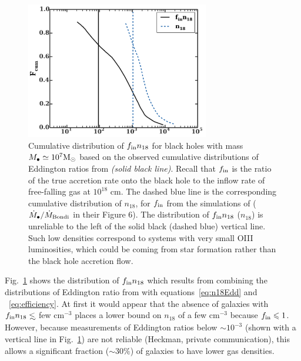 \documentclass[usenatbib,fleqn]{mnras}
\newcommand\lsim{\mathrel{\rlap{\lower4pt\hbox{\hskip1pt$\sim$}}
    \raise1pt\hbox{$<$}}}
\newcommand{\Mbh}[1][]{M_{\bullet#1}}
\newcommand{\Msun}{{\rm M_\odot}}
\begin{document}
\begin{figure}
\includegraphics[width=8cm]{fcum_n18.pdf}
\caption{\label{fig:n18Cum} Cumulative distribution of $f_{\rm in}
  n_{18}$ for black holes with mass $\Mbh\simeq 10^{7} \Msun$ based on
  the observed cumulative distributions of Eddington ratios from
  \citet{Kauffmann&Heckman2009} {\it (solid black line)}. Recall that
  $f_{\rm in}$ is the ratio of the true accretion rate onto the black
  hole to the inflow rate of free-falling gas at $10^{18}$ cm.  The
  dashed blue line is the corresponding cumulative distribution of
  $n_{18}$, for $f_{\rm in}$ from the simulations of \citet{Li+2013}
  ($\dot{M}_{\bullet}/\dot{M}_{\rm Bondi}$ in their Figure 6). The
  distribution of $f_{\rm in} n_{18}$ ($n_{18}$) is unreliable to the
  left of the solid black (dashed blue) vertical line. Such low
  densities correspond to systems with very small OIII luminosities,
  which could be coming from star formation rather than the black hole
  accretion flow.}
\end{figure}


Fig.~\ref{fig:n18Cum} shows the distribution of $f_{\rm in} n_{18}$ which results from combining the distributions of Eddington ratio from \citet{Kauffmann&Heckman2009} with equations~\eqref{eq:n18Edd} and
~\eqref{eq:efficiency}.  At first it would appear that the absence of galaxies with $f_{\rm in }n_{18} \lsim$ few cm$^{-3}$ places a lower bound on $n_{18}$ of a few cm$^{-3}$ because $f_{\rm in} \le 1$.  However, because measurements of Eddington ratios below $\sim 10^{-3}$ (shown with a vertical line in Fig.~\ref{fig:n18Cum}) are not reliable (Heckman, private communication), this allows a significant fraction ($\sim 30\%$) of galaxies to have lower gas densities.
\end{document}
